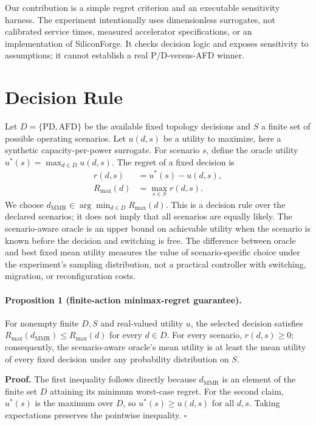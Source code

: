 \documentclass[11pt]{article}
\begin{document}
Our contribution is a simple regret criterion and an executable sensitivity harness. The experiment intentionally uses dimensionless surrogates, not calibrated service times, measured accelerator specifications, or an implementation of SiliconForge. It checks decision logic and exposes sensitivity to assumptions; it cannot establish a real P/D-versus-AFD winner.

\section{Decision Rule}
Let $D=\{\mathrm{PD},\mathrm{AFD}\}$ be the available fixed topology decisions and $S$ a finite set of possible operating scenarios. Let $u(d,s)$ be a utility to maximize, here a synthetic capacity-per-power surrogate. For scenario $s$, define the oracle utility $u^*(s)=\max_{d\in D}u(d,s)$. The regret of a fixed decision is
\begin{equation}
 \begin{aligned}
 r(d,s)&=u^*(s)-u(d,s),\\
 R_{\max}(d)&=\max_{s\in S}r(d,s).
 \end{aligned}
\end{equation}
We choose $d_{\mathrm{MMR}}\in\arg\min_{d\in D}R_{\max}(d)$. This is a decision rule over the declared scenarios; it does not imply that all scenarios are equally likely. The scenario-aware oracle is an upper bound on achievable utility when the scenario is known before the decision and switching is free. The difference between oracle and best fixed mean utility measures the value of scenario-specific choice under the experiment's sampling distribution, not a practical controller with switching, migration, or reconfiguration costs.

\paragraph{Proposition 1 (finite-action minimax-regret guarantee).} For nonempty finite $D,S$ and real-valued utility $u$, the selected decision satisfies $R_{\max}(d_{\mathrm{MMR}})\le R_{\max}(d)$ for every $d\in D$. For every scenario, $r(d,s)\ge0$; consequently, the scenario-aware oracle's mean utility is at least the mean utility of every fixed decision under any probability distribution on $S$.

\noindent\textbf{Proof.} The first inequality follows directly because $d_{\mathrm{MMR}}$ is an element of the finite set $D$ attaining its minimum worst-case regret. For the second claim, $u^*(s)$ is the maximum over $D$, so $u^*(s)\ge u(d,s)$ for all $d,s$. Taking expectations preserves the pointwise inequality. $\square$
\end{document}
